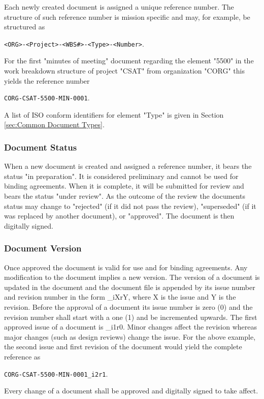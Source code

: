 Each newly created document is assigned a unique reference number. The structure of such reference number is mission specific and may, for example, be structured as

\texttt{<ORG>-<Project>-<WBS\#>-<Type>-<Number>}. 

For the first "minutes of meeting" document regarding the element "5500" in the work breakdown structure of  project "CSAT" from organization "CORG" this yields the reference number 

\texttt{CORG-CSAT-5500-MIN-0001}. 

A list of ISO conform identifiers for element "Type" is given in Section \ref{sec:Common Document Types}.

\subsubsection{Document Status}

When a new document is created and assigned a reference number, it bears the status "in preparation". It is considered preliminary and cannot be used for binding agreements. When it is complete, it will be submitted for review and bears the status "under review". As the outcome of the review the documents status may change to "rejected" (if it did not pass the review), "superseded" (if it was replaced by another document), or "approved". The document is then digitally signed.

\subsubsection{Document Version}

Once approved the document is valid for use and for binding agreements. Any modification to the document implies a new version. The version of a document is updated in the document  and the document file is appended by its issue number and revision number in the form \_iXrY, where X is the issue and Y is the revision. Before the approval of a document its issue number is zero (0) and the revision number shall start with a one (1) and be incremented upwards. The first approved issue of a document is \_i1r0. Minor changes affect the revision whereas major changes (such as design reviews) change the issue. For the above example, the second issue and first revision of the document would yield the complete reference as 

\texttt{CORG-CSAT-5500-MIN-0001\_i2r1}.

Every change of a document shall be approved and digitally signed to take affect.

